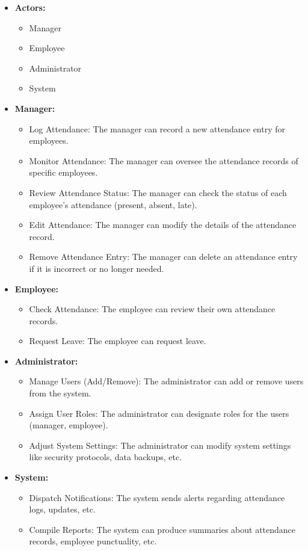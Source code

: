\documentclass[a4paper, 12pt]{article}
\begin{document}
\begin{itemize}
    \item \textbf{Actors:}
    \begin{itemize}
        \item Manager
        \item Employee
        \item Administrator
        \item System
    \end{itemize}
    \item \textbf{Manager:}
    \begin{itemize}
        \item Log Attendance: The manager can record a new attendance entry for employees.
        \item Monitor Attendance: The manager can oversee the attendance records of specific employees.
        \item Review Attendance Status: The manager can check the status of each employee’s attendance (present, absent, late).
        \item Edit Attendance: The manager can modify the details of the attendance record.
        \item Remove Attendance Entry: The manager can delete an attendance entry if it is incorrect or no longer needed.
    \end{itemize}
    \newpage
    \item \textbf{Employee:}
    \begin{itemize}
        \item Check Attendance: The employee can review their own attendance records.
        \item Request Leave: The employee can request leave.
    \end{itemize}
    \item \textbf{Administrator:}
    \begin{itemize}
        \item Manage Users (Add/Remove): The administrator can add or remove users from the system.
        \item Assign User Roles: The administrator can designate roles for the users (manager, employee).
        \item Adjust System Settings: The administrator can modify system settings like security protocols, data backups, etc.
    \end{itemize}
    \item \textbf{System:}
    \begin{itemize}
        \item Dispatch Notifications: The system sends alerts regarding attendance logs, updates, etc.
        \item Compile Reports: The system can produce summaries about attendance records, employee punctuality, etc.
    \end{itemize}
\end{itemize}
\end{document}
